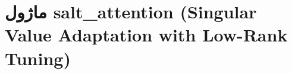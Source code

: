 \section{ماژول salt\_attention (Singular Value Adaptation with Low-Rank Tuning)}
\label{sec:module_salt_attention}
